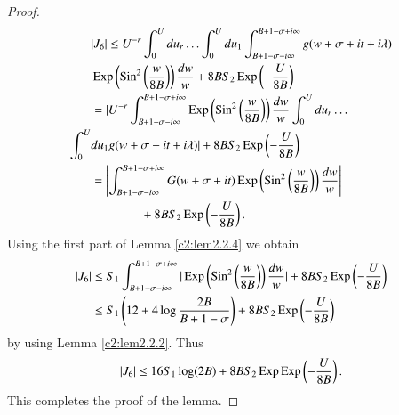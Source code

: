 \begin{proof}
\begin{align*}
& |J_6| \leq U^{-r} \int^{U}_0 du_r \ldots \int^U_0 du_1 \int^{B+1-\sigma + i \infty}_{B+1-\sigma - i \infty} g(w+ \sigma + it + i \lambda)\\
&  \operatorname{Exp} \left(\operatorname{Sin}^2 \left(\frac{w}{8B}\right)\right) \frac{dw}{w}  + 8 B S_2 \operatorname{Exp} \left(-\frac{U}{8B}\right)\\
& = |U^{-r} \int^{B+1-\sigma + i \infty}_{B+1-\sigma - i \infty} \operatorname{Exp} \left(\operatorname{Sin}^2 \left(\frac{w}{8B} \right) \right) \frac{dw}{w} \int^{U}_0 du_r \ldots \\ 
\int^U_0 & du_1 g(w+\sigma + it + i\lambda)| + 8 B S_2 \operatorname{Exp} \left(-\frac{U}{8B} \right)\\
& = \left|\int^{B+1-\sigma + i \infty}_{B+1-\sigma - i\infty} G(w+\sigma +
it) \operatorname{Exp} \left(\operatorname{Sin}^2 \left(\frac{w}{8B} \right) \right)
\frac{dw}{w}\right|\\ 
&\qquad\qquad + 8BS_2 \operatorname{Exp} \left(-\frac{U}{8B} \right). 
\end{align*}\pageoriginale
Using the first part of Lemma \ref{c2:lem2.2.4} we obtain
\begin{align*}
|J_6| & \leq S_1 \int^{B+1-\sigma + i\infty}_{B+1-\sigma - i \infty} | \operatorname{Exp} \left(\operatorname{Sin}^2 \left(\frac{w}{8B} \right) \right) \frac{dw}{w}| + 8 BS_2 \operatorname{Exp} \left(-\frac{U}{8B} \right)\\
& \leq S_1 \left(12 + 4 \log \frac{2B}{B+1-\sigma} \right) + 8 B S_2 \operatorname{Exp} \left(-\frac{U}{8B} \right)
\end{align*}
by using Lemma \ref{c2:lem2.2.2}. Thus
$$
|J_6| \leq 16 S_1 \log (2B) + 8 BS_2 \operatorname{Exp} \operatorname{Exp} \left( -\frac{U}{8B}\right).
$$
This completes the proof of the lemma.
\end{proof}

